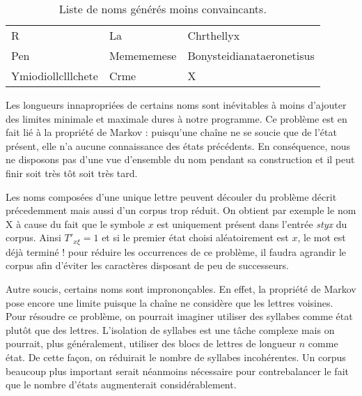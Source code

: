 \documentclass[12pt]{article}
\begin{document}
\begin{table}[H]
  \centering

  \begin{tabular}{l|l|l}
    R & La & Chrthellyx \\
    Pen & Memememese & Bonysteidianataeronetisus \\
    Ymiodiollclllchete & Crme & X
  \end{tabular}

  \caption{Liste de noms générés moins convaincants.}
  \label{pasbons}

\end{table}

Les longueurs innapropriées de certains noms sont inévitables à moins
d'ajouter des limites minimale et maximale dures à notre programme. Ce
problème est en fait lié à la propriété de Markov : puisqu'une chaîne
ne se soucie que de l'état présent, elle n'a aucune connaissance des
états précédents. En conséquence, nous ne disposons pas d'une vue
d'ensemble du nom pendant sa construction et il peut finir soit très
tôt soit très tard.

Les noms composées d'une unique lettre peuvent découler du problème
décrit précedemment mais aussi d'un corpus trop réduit. On obtient par
exemple le nom X à cause du fait que le symbole $x$ est uniquement
présent dans l'entrée \textit{styx} du corpus. Ainsi ${T'}_{x\xi} = 1$
et si le premier état choisi aléatoirement est $x$, le mot est déjà
terminé ! pour réduire les occurrences de ce problème, il faudra
agrandir le corpus afin d'éviter les caractères disposant de peu
de successeurs.

Autre soucis, certains noms sont imprononçables. En effet, la
propriété de Markov pose encore une limite puisque la chaîne ne
considère que les lettres voisines. Pour résoudre ce problème, on
pourrait imaginer utiliser des syllabes comme état plutôt que des
lettres. L'isolation de syllabes est une tâche complexe mais on
pourrait, plus généralement, utiliser des blocs de lettres de longueur
$n$ comme état. De cette façon, on réduirait le nombre de syllabes
incohérentes. Un corpus beaucoup plus important serait néanmoins
nécessaire pour contrebalancer le fait que le nombre d'états
augmenterait considérablement.



\end{document}
